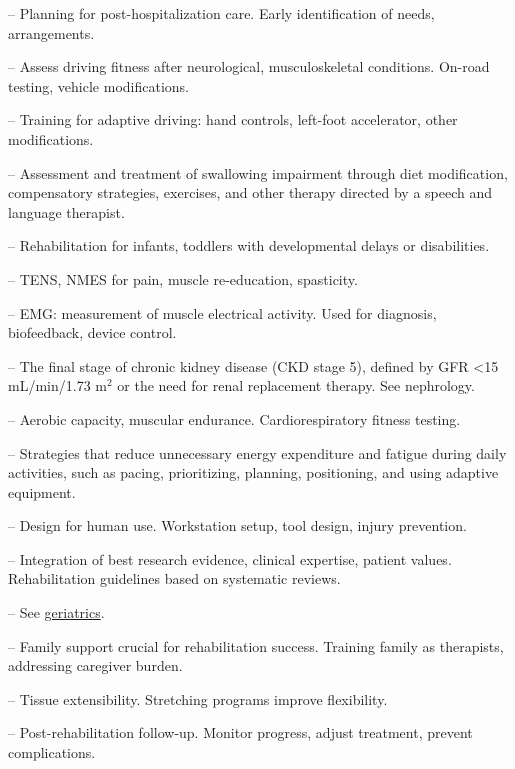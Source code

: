 -- Planning for post-hospitalization care. Early identification of needs, arrangements.

-- Assess driving fitness after neurological, musculoskeletal conditions. On-road testing, vehicle modifications.

-- Training for adaptive driving: hand controls, left-foot accelerator, other modifications.

-- Assessment and treatment of swallowing impairment through diet modification, compensatory strategies, exercises, and other therapy directed by a speech and language therapist.

-- Rehabilitation for infants, toddlers with developmental delays or disabilities.

-- TENS, NMES for pain, muscle re-education, spasticity.

-- EMG: measurement of muscle electrical activity. Used for diagnosis, biofeedback, device control.

-- The final stage of chronic kidney disease (CKD stage 5), defined by GFR <15 mL/min/1.73 m$^2$ or the need for renal replacement therapy. See nephrology.

-- Aerobic capacity, muscular endurance. Cardiorespiratory fitness testing.

-- Strategies that reduce unnecessary energy expenditure and fatigue during daily activities, such as pacing, prioritizing, planning, positioning, and using adaptive equipment.

-- Design for human use. Workstation setup, tool design, injury prevention.

-- Integration of best research evidence, clinical expertise, patient values. Rehabilitation guidelines based on systematic reviews.

-- See \hyperlink{Geriatrics}{geriatrics}.

-- Family support crucial for rehabilitation success. Training family as therapists, addressing caregiver burden.

-- Tissue extensibility. Stretching programs improve flexibility.

-- Post-rehabilitation follow-up. Monitor progress, adjust treatment, prevent complications.

